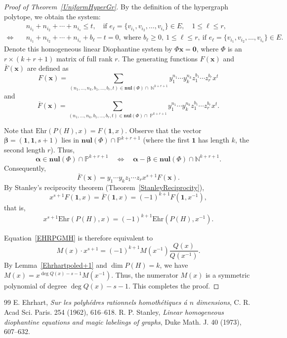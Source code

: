 \documentclass[10pt,a4paper]{amsart}
\begin{document}
\begin{proof}[Proof of Theorem~\ref{UniformHyperGr}]
By the definition of the hypergraph polytope, we obtain the system:
\begin{align*}
&n_{i_1} + n_{i_2} + \cdots + n_{i_s} \leq t, \quad \text{if  } e_\ell=\{v_{i_1}, v_{i_2}, \ldots, v_{i_s}\} \in E,\quad 1 \leq \ell \leq r, \\
\Longleftrightarrow \quad & n_{i_1} + n_{i_2} + \cdots + n_{i_s} + b_{\ell} - t = 0,\ \text{where } b_{\ell} \geq 0,\ 1 \leq \ell \leq r,\ \text{if }e_\ell=\{v_{i_1}, v_{i_2}, \ldots, v_{i_s}\} \in E.
\end{align*}
Denote this homogeneous linear Diophantine system by $\Phi \mathbf{x} = \mathbf{0}$, where $\Phi$ is an $r \times (k + r + 1)$ matrix of full rank $r$. The generating functions $F(\mathbf{x})$ and $\overline{F}(\mathbf{x})$ are defined as
\[
F(\mathbf{x}) = \sum_{(n_1,\ldots,n_k, b_1,\ldots,b_r,t) \in \mathbf{nul}(\Phi) \cap \; \mathbb{N}^{k+r+1}} y_1^{n_1} \cdots y_k^{n_k} z_1^{b_1} \cdots z_r^{b_r} x^t
\]
and
\[
\overline{F}(\mathbf{x}) = \sum_{(n_1,\ldots,n_k, b_1,\ldots,b_r,t) \in \mathbf{nul}(\Phi) \cap \; \mathbb{P}^{k+r+1}} y_1^{n_1} \cdots y_k^{n_k} z_1^{b_1} \cdots z_r^{b_r} x^t.
\]

Note that $\mathrm{Ehr}(P(H), x) = F(\mathbf{1}, x)$. Observe that the vector $\boldsymbol{\beta} = (\boldsymbol{1}, \boldsymbol{1}, s+1)$ lies in $\mathbf{nul}(\Phi) \cap \mathbb{P}^{k+r+1}$ (where the first $\boldsymbol{1}$ has length $k$, the second length $r$). Thus,
\[
\boldsymbol{\alpha} \in \mathbf{nul}(\Phi) \cap \mathbb{P}^{k+r+1} \quad \Longleftrightarrow \quad \boldsymbol{\alpha} - \boldsymbol{\beta} \in \mathbf{nul}(\Phi) \cap \mathbb{N}^{k+r+1}.
\]
Consequently,
\[
\overline{F}(\mathbf{x}) = y_1 \cdots y_k z_1 \cdots z_r x^{s+1} F(\mathbf{x}).
\]
By Stanley's reciprocity theorem (Theorem~\ref{StanleyReciprocity}),
\[
x^{s+1} F(\mathbf{1}, x) = \overline{F}(\mathbf{1}, x) = (-1)^{k+1} F(\mathbf{1}, x^{-1}),
\]
that is,
\begin{align}\label{EHRPGMH}
x^{s+1} \mathrm{Ehr}(P(H), x) = (-1)^{k+1} \mathrm{Ehr}(P(H), x^{-1}).
\end{align}


Equation~\eqref{EHRPGMH} is therefore equivalent to
\[
M(x) \cdot x^{s+1} = (-1)^{k+1} M(x^{-1}) \frac{Q(x)}{Q(x^{-1})}.
\]
By Lemma~\ref{Ehrhartpoled+1} and $\dim P(H)=k$, we have $M(x) = x^{\deg Q(x) - s - 1} M(x^{-1})$.
Thus, the numerator $M(x)$ is a symmetric polynomial of degree $\deg Q(x) - s - 1$.
This completes the proof.
\end{proof}

\begin{thebibliography}{99}
 E. Ehrhart, \emph{Sur les polyh\'edres rationnels homoth\'etiques \'a $n$ dimensions}, C. R. Acad Sci. Paris. 254 (1962), 616--618.
 R. P. Stanley, \emph{Linear homogeneous diophantine equations and magic labelings of graphs}, Duke Math. J. 40 (1973), 607--632.
\end{thebibliography}
\end{document}
